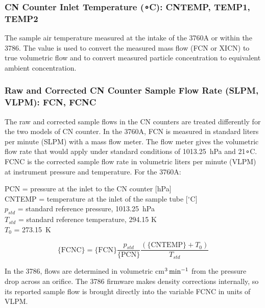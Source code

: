\documentclass[
  english,
]{book}
\begin{document}
\hypertarget{cntemp}{%
\subsubsection*{\texorpdfstring{CN Counter Inlet Temperature ({∘}C): CNTEMP, TEMP1, TEMP2}{CN Counter Inlet Temperature (∘C): CNTEMP, TEMP1, TEMP2}}\label{cntemp}}

The sample air temperature measured at the intake of the 3760A or within the 3786. The value is used to convert the measured mass flow (FCN or XICN) to true volumetric flow and to convert measured particle concentration to equivalent ambient concentration.

\hypertarget{fcnc}{%
\subsubsection*{Raw and Corrected CN Counter Sample Flow Rate (SLPM, VLPM): FCN, FCNC}\label{fcnc}}

The raw and corrected sample flows in the CN counters are treated differently for the two models of CN counter. In the 3760A, FCN is measured in standard liters per minute (SLPM) with a mass flow meter. The flow meter gives the volumetric flow rate that would apply under standard conditions of 1013.25~hPa and 21{∘}C. FCNC is the corrected sample flow rate in volumetric liters per minute (VLPM) at instrument pressure and temperature. For the 3760A:

PCN = pressure at the inlet to the CN counter {[}hPa{]}\\
CNTEMP = temperature at the inlet of the sample tube {[}\(^{\circ}\)C{]}\\
\(p_{std}\) = standard
reference pressure, 1013.25~hPa\\
\(T_{std}\) = standard
reference temperature, 294.15 K\\
\(T_{0}\) = 273.15~K

\begin{equation}
\mathrm{\{FCNC\} = \{FCN\}}\frac{p_{std}}{\mathrm{\{PCN\}}}\frac{(\{\mathrm{CNTEMP\}}+T_{0})}{T_{std}}
\label{eq:FCNCbox}
\end{equation}

In the 3786, flows are determined in volumetric cm{\(^{3}\thinspace\mathrm{min}^{-1}\)} from the pressure drop across an orifice. The 3786 firmware makes density corrections internally, so its reported sample flow is brought directly into the variable FCNC in units of VLPM.
\end{document}

